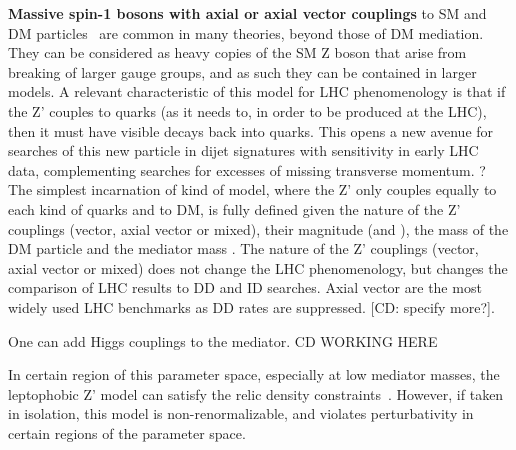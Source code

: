 \textbf{Massive spin-1 bosons with axial or axial vector couplings} to SM and DM particles~\cite{Shoemaker:2011vi} are common in many theories, beyond those of DM mediation. They can be considered as heavy copies of the SM Z boson that arise from breaking of larger gauge groups, and as such they can be contained in larger models. A relevant characteristic of this model for LHC phenomenology is that if the Z' couples to quarks (as it needs to, in order to be produced at the LHC), then it must have visible decays back into quarks. This opens a new avenue for searches of this new particle in dijet signatures with sensitivity in early LHC data, complementing searches for excesses of missing transverse momentum. 
?
The simplest incarnation of kind of model, where the Z' only couples equally to each kind of quarks and to DM, is fully defined given the nature of the Z' couplings (vector, axial vector or mixed), their magnitude (\gq and \gDM), the mass of the DM particle \mdm and the mediator mass \mmed. The nature of the Z' couplings (vector, axial vector or mixed) does not change the LHC phenomenology, but changes the comparison of LHC results to DD and ID searches. Axial vector are the most widely used LHC benchmarks as DD rates are suppressed. [CD: specify more?]. 

One can add Higgs couplings to the mediator. CD WORKING HERE

In certain region of this parameter space, especially at low mediator masses, the leptophobic Z' model can satisfy the relic density constraints~\cite{Chala:2015ama}. However, if taken in isolation, this model is non-renormalizable, and violates perturbativity in certain regions of the parameter space. 

